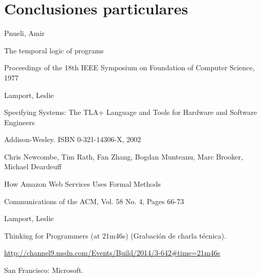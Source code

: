 \documentclass[spanish]{llncs}
\begin{document}
\section{Conclusiones particulares}



%
%
\begin{thebibliography}{5}
%
Pnueli, Amir

The temporal logic of programs

Proceedings of the 18th IEEE Symposium on Foundation of Computer Science, 1977

Lamport, Leslie

Specifying Systems: The TLA+ Language and Tools for Hardware and Software Engineers

Addison-Wesley. ISBN 0-321-14306-X, 2002

Chris Newcombe, Tim Rath, Fan Zhang, Bogdan Munteanu, Marc Brooker, Michael Deardeuff 

How Amazon Web Services Uses Formal Methods

Communications of the ACM, Vol. 58 No. 4, Pages 66-73

Lamport, Leslie 

Thinking for Programmers (at 21m46s) (Grabación de charla técnica). 

\url{http://channel9.msdn.com/Events/Build/2014/3-642#time=21m46s}

San Francisco: Microsoft.

\end{thebibliography}

\clearpage
\end{document}
